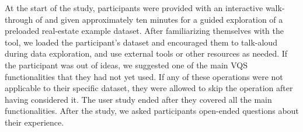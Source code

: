   \par At the start of the  study, participants were provided with an interactive walk-through of \zvpp and given approximately ten minutes for a guided exploration of a preloaded real-estate example dataset. After familiarizing themselves with the tool, we loaded the participant's dataset and encouraged them to talk-aloud during data exploration, and use external tools or other resources as needed. If the participant was out of ideas, we suggested one of the main VQS functionalities that they had not yet used. If any of these operations were not applicable to their specific dataset, they were allowed to skip the operation after having considered it. The user study  ended after they covered all the main functionalities. After the study, we asked participants open-ended questions about their experience.%